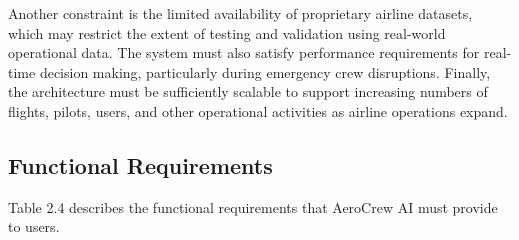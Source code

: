 \documentclass[12pt,a4paper]{report}
\begin{document}
Another constraint is the limited availability of proprietary airline datasets, which may restrict the extent of testing and validation using real-world operational data. The system must also satisfy performance requirements for real-time decision making, particularly during emergency crew disruptions. Finally, the architecture must be sufficiently scalable to support increasing numbers of flights, pilots, users, and other operational activities as airline operations expand.

\subsection{Functional Requirements}

Table 2.4 describes the functional requirements that AeroCrew AI must provide to users.
\end{document}
